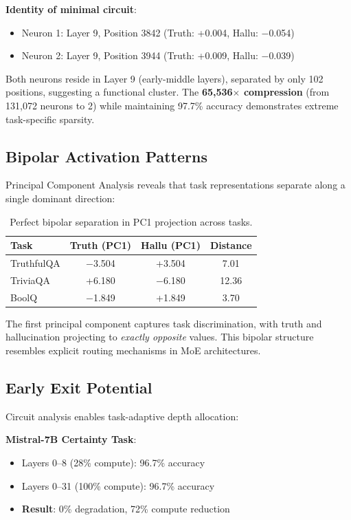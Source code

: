 \documentclass{article}
\begin{document}
\textbf{Identity of minimal circuit}:
\begin{itemize}
    \item Neuron 1: Layer 9, Position 3842 (Truth: +0.004, Hallu: $-$0.054)
    \item Neuron 2: Layer 9, Position 3944 (Truth: +0.009, Hallu: $-$0.039)
\end{itemize}

Both neurons reside in Layer 9 (early-middle layers), separated by only 102 positions, suggesting a functional cluster. The \textbf{65,536$\times$ compression} (from 131,072 neurons to 2) while maintaining 97.7\% accuracy demonstrates extreme task-specific sparsity.

\subsection{Bipolar Activation Patterns}

Principal Component Analysis reveals that task representations separate along a single dominant direction:

\begin{table}[h]
\centering
\begin{tabular}{@{}lccc@{}}
\toprule
\textbf{Task} & \textbf{Truth (PC1)} & \textbf{Hallu (PC1)} & \textbf{Distance} \\
\midrule
TruthfulQA & $-$3.504 & +3.504 & 7.01 \\
TriviaQA & +6.180 & $-$6.180 & 12.36 \\
BoolQ & $-$1.849 & +1.849 & 3.70 \\
\bottomrule
\end{tabular}
\caption{Perfect bipolar separation in PC1 projection across tasks.}
\label{tab:bipolar}
\end{table}

The first principal component captures task discrimination, with truth and hallucination projecting to \textit{exactly opposite} values. This bipolar structure resembles explicit routing mechanisms in MoE architectures.

\subsection{Early Exit Potential}

Circuit analysis enables task-adaptive depth allocation:

\textbf{Mistral-7B Certainty Task}:
\begin{itemize}
    \item Layers 0--8 (28\% compute): 96.7\% accuracy
    \item Layers 0--31 (100\% compute): 96.7\% accuracy
    \item \textbf{Result}: 0\% degradation, 72\% compute reduction
\end{itemize}
\end{document}
